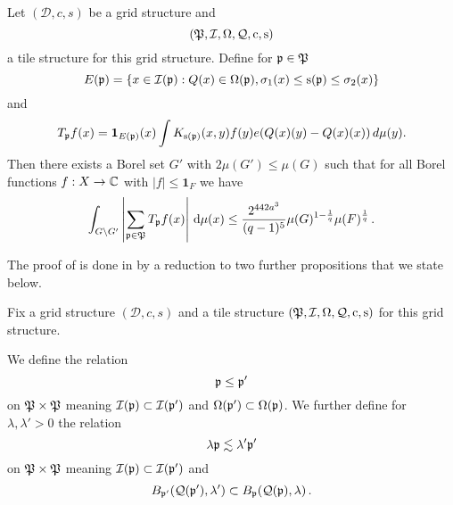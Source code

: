 \begin{proposition}
\label{discrete-Carleson}
\leanok
{}
Let $(\mathcal{D}, c, s)$ be a grid structure and
\begin{equation*}
    ({\mathfrak P},{\mathcal{I}},{\Omega},{\mathcal{Q}},{\mathrm{c}},{\mathrm{s}})
\end{equation*}
a tile structure for this grid structure.
Define for ${\mathfrak p}\in {\mathfrak P}$
\begin{equation}\label{defineep}
    E({\mathfrak p})=\{x\in {\mathcal{I}}({\mathfrak p}): {Q}(x)\in {\Omega}({\mathfrak p}) , {\sigma_1}(x)\le {\mathrm{s}}({\mathfrak p})\le {\sigma_2}(x)\}
\end{equation}
and
\begin{equation}\label{definetp}
    T_{{\mathfrak p}} f(x)= \mathbf{1}_{E({\mathfrak p})}(x) \int K_{{\mathrm{s}}({\mathfrak p})}(x,y) f(y) e({Q}(x)(y)-{Q}(x)(x))\, d\mu(y).
\end{equation}
Then there exists a Borel set $G'$ with $2\mu(G') \leq \mu(G)$ such that for all Borel functions $f:X\to \mathbb{C}$ with $|f|\le \mathbf{1}_F$
we have
\begin{equation}
    \label{disclesssim}
   \int_{G \setminus G'} \left| \sum_{{\mathfrak p} \in {\mathfrak P}} T_{{\mathfrak p}} f (x) \right| \, \mathrm{d}\mu(x) \le \frac{2^{442a^3}}{(q-1)^5} \mu(G)^{1-\frac{1}{q}} \mu(F)^{\frac{1}{q}}\,.
\end{equation}
\end{proposition}









The proof of  is done in 
by a reduction to two further propositions that we state below.


Fix a grid structure $(\mathcal{D}, c, s)$ and a tile structure $({\mathfrak P},{\mathcal{I}},{\Omega},{\mathcal{Q}},{\mathrm{c}},{\mathrm{s}})$
for this grid structure.

We define the relation
\begin{equation}\label{straightorder}
    {\mathfrak p}\le {\mathfrak p}'
\end{equation}
 on ${\mathfrak P}\times {\mathfrak P}$ meaning
${\mathcal{I}}({\mathfrak p})\subset {\mathcal{I}}({\mathfrak p}')$ and
$\Omega({\mathfrak p}')\subset \Omega({\mathfrak p})$.
We further define for $\lambda,\lambda' >0$
the relation
\begin{equation}\label{wiggleorder}
    \lambda {\mathfrak p} \lesssim \lambda' {\mathfrak p}'
\end{equation}
on ${\mathfrak P}\times {\mathfrak P}$ meaning
${\mathcal{I}}({\mathfrak p})\subset {\mathcal{I}}({\mathfrak p}')$ and
\begin{equation}
    B_{{\mathfrak p}'}({\mathcal{Q}}({\mathfrak p}'),\lambda') \subset B_{{\mathfrak p}}({\mathcal{Q}}({\mathfrak p}),\lambda)\, .
\end{equation}



